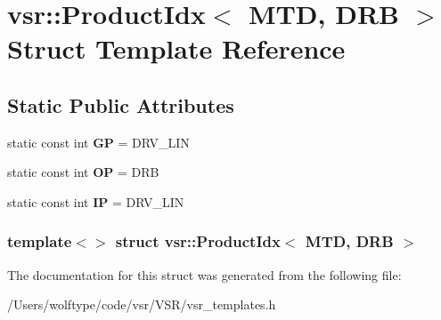 \hypertarget{structvsr_1_1_product_idx_3_01_m_t_d_00_01_d_r_b_01_4}{\section{vsr\-:\-:Product\-Idx$<$ M\-T\-D, D\-R\-B $>$ Struct Template Reference}
\label{structvsr_1_1_product_idx_3_01_m_t_d_00_01_d_r_b_01_4}
}
\subsection*{Static Public Attributes}
\begin{DoxyCompactItemize}
\item 
\hypertarget{structvsr_1_1_product_idx_3_01_m_t_d_00_01_d_r_b_01_4_a4b833a4ba7736b54c955686e50119f76}{static const int {\bfseries G\-P} = D\-R\-V\-\_\-\-L\-I\-N}\label{structvsr_1_1_product_idx_3_01_m_t_d_00_01_d_r_b_01_4_a4b833a4ba7736b54c955686e50119f76}

\item 
\hypertarget{structvsr_1_1_product_idx_3_01_m_t_d_00_01_d_r_b_01_4_a27a54655ba5fa07275b94f2974f7bcbe}{static const int {\bfseries O\-P} = D\-R\-B}\label{structvsr_1_1_product_idx_3_01_m_t_d_00_01_d_r_b_01_4_a27a54655ba5fa07275b94f2974f7bcbe}

\item 
\hypertarget{structvsr_1_1_product_idx_3_01_m_t_d_00_01_d_r_b_01_4_a1a39823cbf55b27a6eb4b350b22bbcad}{static const int {\bfseries I\-P} = D\-R\-V\-\_\-\-L\-I\-N}\label{structvsr_1_1_product_idx_3_01_m_t_d_00_01_d_r_b_01_4_a1a39823cbf55b27a6eb4b350b22bbcad}

\end{DoxyCompactItemize}
\subsubsection*{template$<$$>$ struct vsr\-::\-Product\-Idx$<$ M\-T\-D, D\-R\-B $>$}



The documentation for this struct was generated from the following file\-:\begin{DoxyCompactItemize}
\item 
/\-Users/wolftype/code/vsr/\-V\-S\-R/vsr\-\_\-templates.\-h\end{DoxyCompactItemize}
